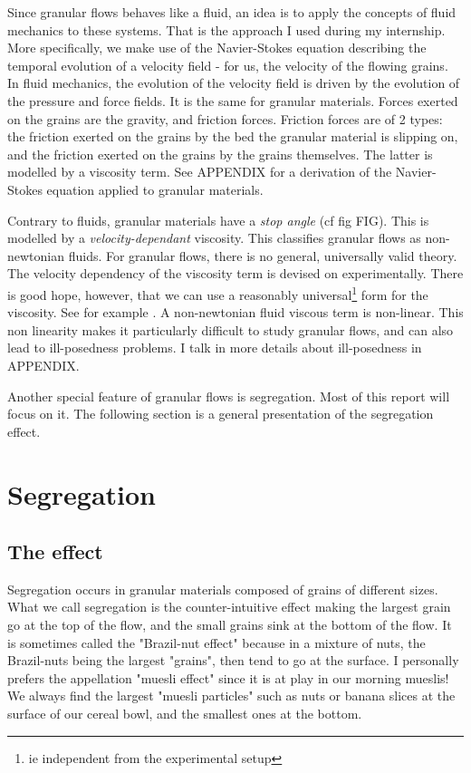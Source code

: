 \documentclass[11pt,a4paper]{report}
\begin{document}
Since granular flows behaves like a fluid, an idea is to apply the concepts of fluid mechanics to these systems. That is the approach I used during my internship.
More specifically, we make use of the Navier-Stokes equation describing the temporal evolution of a velocity field - for us, the velocity of the flowing grains. In fluid mechanics, the evolution of the velocity field is driven by the evolution of the pressure and force fields. It is the same for granular materials. Forces exerted on the grains are the gravity, and friction forces. Friction forces are of 2 types: the friction exerted on the grains by the bed the granular material is slipping on, and the friction exerted on the grains by the grains themselves. The latter is modelled by a viscosity term. See APPENDIX for a derivation of the Navier-Stokes equation applied to granular materials.

Contrary to fluids, granular materials have a \textit{stop angle} (cf fig FIG). 
This is modelled by a \textit{velocity-dependant} viscosity. This classifies granular flows as non-newtonian fluids. For granular flows, there is no general, universally valid theory. The velocity dependency of the viscosity term is devised on experimentally. There is good hope, however, that we can use a reasonably universal\footnote{ie independent from the experimental setup} form for the viscosity. See for example \cite{pouli}.
A non-newtonian fluid viscous term is non-linear. This non linearity makes it particularly difficult to study granular flows, and can also lead to ill-posedness problems. I talk in more details about ill-posedness in APPENDIX.

Another special feature of granular flows is segregation. Most of this report will focus on it. The following section is a general presentation of the segregation effect.

\section{Segregation}

\subsection{The effect}

Segregation occurs in granular materials composed of grains of different sizes. What we call segregation is the counter-intuitive effect making the largest grain go at the top of the flow, and the small grains sink at the bottom of the flow. 
It is sometimes called the "Brazil-nut effect" because in a mixture of nuts, the Brazil-nuts being the largest "grains", then tend to go at the surface. I personally prefers the appellation "muesli effect" since it is at play in our morning mueslis! We always find the largest "muesli particles" such as nuts or banana slices at the surface of our cereal bowl, and the smallest ones at the bottom. 
\end{document}
